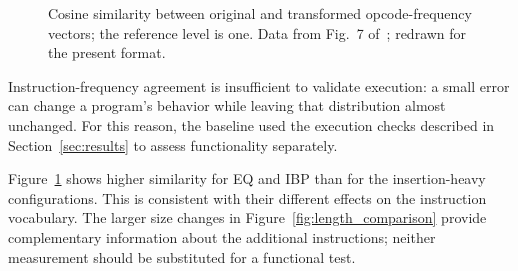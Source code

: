 \documentclass[runningheads]{llncs}
\providecommand{\Description}[1]{}
\begin{document}
\begin{figure}[tbp]
\Description{Cosine similarity between original and transformed opcode-frequency vectors; the reference level is one. Orange circles identify x64 and blue squares identify x86.}
\caption{Cosine similarity between original and transformed opcode-frequency vectors; the reference level is one. Data from Fig.~7 of~\cite{zone_secrypt_2026}; redrawn for the present format.}
\label{fig:cosine_similarity}
\end{figure}

Instruction-frequency agreement is insufficient to validate execution: a small error can change a program's behavior while leaving that distribution almost unchanged. For this reason, the baseline used the execution checks described in Section~\ref{sec:results} to assess functionality separately.

Figure~\ref{fig:cosine_similarity} shows higher similarity for EQ and IBP than for the insertion-heavy configurations. This is consistent with their different effects on the instruction vocabulary. The larger size changes in Figure~\ref{fig:length_comparison} provide complementary information about the additional instructions; neither measurement should be substituted for a functional test.
\end{document}
